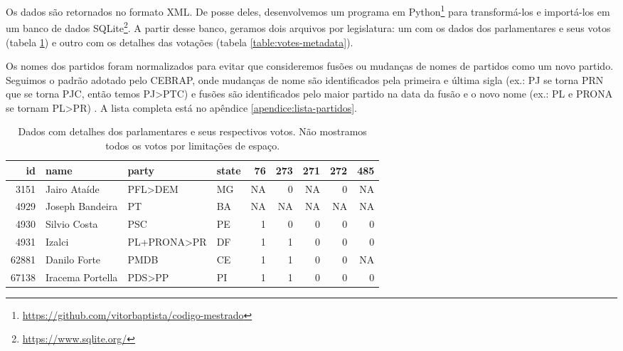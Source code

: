 Os dados são retornados no formato \gls{XML}. De posse deles, desenvolvemos um
programa em
Python\footnote{\url{https://github.com/vitorbaptista/codigo-mestrado}} para
transformá-los e importá-los em um banco de dados
SQLite\footnote{\url{https://www.sqlite.org/}}. A partir desse banco, geramos
dois arquivos por legislatura: um com os dados dos parlamentares e seus votos
(tabela \ref{table:votes}) e outro com os detalhes das votações (tabela
\ref{table:votes-metadata}).

Os nomes dos partidos foram normalizados para evitar que consideremos fusões ou
mudanças de nomes de partidos como um novo partido. Seguimos o padrão adotado
pelo \gls{CEBRAP}, onde mudanças de nome são identificados pela primeira e
última sigla (ex.: PJ se torna PRN que se torna PJC, então temos PJ>PTC) e
fusões são identificados pelo maior partido na data da fusão e o novo nome
(ex.: PL e PRONA se tornam PL>PR) \cite{Freitas2008}. A lista completa está no
apêndice \ref{apendice:lista-partidos}.

\begin{table}
\centering
\begin{knitrout}
\color{fgcolor}\begin{kframe}
\begin{alltt}
\hlstd{(}\hlstd{(votes[[}\hlstd{]][,} \hlstd{(}\hlopt{:}\hlstd{)]))}
\end{alltt}
\end{kframe}
\begin{tabular}{r|l|l|l|r|r|r|r|r}
\hline
id & name & party & state & 76 & 273 & 271 & 272 & 485\\
\hline
3151 & Jairo Ataíde & PFL>DEM & MG & NA & 0 & NA & 0 & NA\\
\hline
4929 & Joseph Bandeira & PT & BA & NA & NA & NA & NA & NA\\
\hline
4930 & Silvio Costa & PSC & PE & 1 & 0 & 0 & 0 & 0\\
\hline
4931 & Izalci & PL+PRONA>PR & DF & 1 & 1 & 0 & 0 & 0\\
\hline
62881 & Danilo Forte & PMDB & CE & 1 & 1 & 0 & 0 & NA\\
\hline
67138 & Iracema Portella & PDS>PP & PI & 1 & 1 & 0 & 0 & 0\\
\hline
\end{tabular}


\end{knitrout}
\caption{Dados com detalhes dos parlamentares e seus respectivos votos. Não
mostramos todos os votos por limitações de espaço.}
\label{table:votes}
\end{table}

